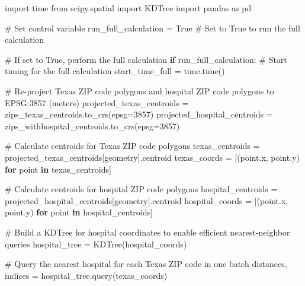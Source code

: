 \documentclass[
  letterpaper,
  DIV=11,
  numbers=noendperiod]{scrartcl}
\newenvironment{Shaded}{\begin{snugshade}}{\end{snugshade}}
\newcommand{\CommentTok}[1]{\textcolor[rgb]{0.37,0.37,0.37}{#1}}
\newcommand{\ControlFlowTok}[1]{\textcolor[rgb]{0.00,0.23,0.31}{\textbf{#1}}}
\newcommand{\DecValTok}[1]{\textcolor[rgb]{0.68,0.00,0.00}{#1}}
\newcommand{\ImportTok}[1]{\textcolor[rgb]{0.00,0.46,0.62}{#1}}
\newcommand{\KeywordTok}[1]{\textcolor[rgb]{0.00,0.23,0.31}{\textbf{#1}}}
\newcommand{\NormalTok}[1]{\textcolor[rgb]{0.00,0.23,0.31}{#1}}
\newcommand{\OperatorTok}[1]{\textcolor[rgb]{0.37,0.37,0.37}{#1}}
\newcommand{\StringTok}[1]{\textcolor[rgb]{0.13,0.47,0.30}{#1}}
\newcommand{\VariableTok}[1]{\textcolor[rgb]{0.07,0.07,0.07}{#1}}
\begin{document}
\begin{Shaded}
\begin{Highlighting}[]
\ImportTok{import}\NormalTok{ time}
\ImportTok{from}\NormalTok{ scipy.spatial }\ImportTok{import}\NormalTok{ KDTree}
\ImportTok{import}\NormalTok{ pandas }\ImportTok{as}\NormalTok{ pd}

\CommentTok{\# Set control variable}
\NormalTok{run\_full\_calculation }\OperatorTok{=} \VariableTok{True}  \CommentTok{\# Set to True to run the full calculation}

\CommentTok{\# If set to True, perform the full calculation}
\ControlFlowTok{if}\NormalTok{ run\_full\_calculation:}
    \CommentTok{\# Start timing for the full calculation}
\NormalTok{    start\_time\_full }\OperatorTok{=}\NormalTok{ time.time()}

    \CommentTok{\# Re{-}project Texas ZIP code polygons and hospital ZIP code polygons to EPSG:3857 (meters)}
\NormalTok{    projected\_texas\_centroids }\OperatorTok{=}\NormalTok{ zips\_texas\_centroids.to\_crs(epsg}\OperatorTok{=}\DecValTok{3857}\NormalTok{)}
\NormalTok{    projected\_hospital\_centroids }\OperatorTok{=}\NormalTok{ zips\_withhospital\_centroids.to\_crs(epsg}\OperatorTok{=}\DecValTok{3857}\NormalTok{)}

    \CommentTok{\# Calculate centroids for Texas ZIP code polygons}
\NormalTok{    texas\_centroids }\OperatorTok{=}\NormalTok{ projected\_texas\_centroids[}\StringTok{\textquotesingle{}geometry\textquotesingle{}}\NormalTok{].centroid}
\NormalTok{    texas\_coords }\OperatorTok{=}\NormalTok{ [(point.x, point.y) }\ControlFlowTok{for}\NormalTok{ point }\KeywordTok{in}\NormalTok{ texas\_centroids]}

    \CommentTok{\# Calculate centroids for hospital ZIP code polygons}
\NormalTok{    hospital\_centroids }\OperatorTok{=}\NormalTok{ projected\_hospital\_centroids[}\StringTok{\textquotesingle{}geometry\textquotesingle{}}\NormalTok{].centroid}
\NormalTok{    hospital\_coords }\OperatorTok{=}\NormalTok{ [(point.x, point.y) }\ControlFlowTok{for}\NormalTok{ point }\KeywordTok{in}\NormalTok{ hospital\_centroids]}

    \CommentTok{\# Build a KDTree for hospital coordinates to enable efficient nearest{-}neighbor queries}
\NormalTok{    hospital\_tree }\OperatorTok{=}\NormalTok{ KDTree(hospital\_coords)}

    \CommentTok{\# Query the nearest hospital for each Texas ZIP code in one batch}
\NormalTok{    distances, indices }\OperatorTok{=}\NormalTok{ hospital\_tree.query(texas\_coords)}


\end{Highlighting}
\end{Shaded}
\end{document}
